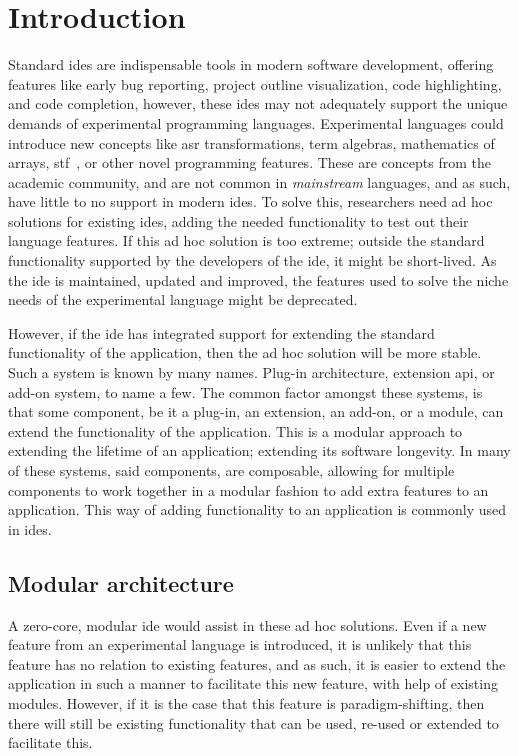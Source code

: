 \chapter{Introduction}

Standard \gls*{ide}s are indispensable tools in modern software development,
offering features like early bug reporting, project outline visualization, code
highlighting, and code completion, however, these \gls*{ide}s may not adequately
support the unique demands of experimental programming languages. Experimental
languages could introduce new concepts like \gls*{asr} transformations, term
algebras, mathematics of arrays, \gls*{stf}~\cite{stf:haveraaen:2020}, or other novel
programming features. These are concepts from the academic community, and are
not common in \textit{mainstream} languages, and as such, have little to no
support in modern \gls*{ide}s. To solve this, researchers need ad hoc solutions
for existing \gls*{ide}s, adding the needed functionality to test out their
language features. If this ad hoc solution is too extreme; outside the standard
functionality supported by the developers of the \gls*{ide}, it might be
short-lived. As the \gls*{ide} is maintained, updated and improved, the features
used to solve the niche needs of the experimental language might be deprecated.

However, if the \gls*{ide} has integrated support for extending the standard
functionality of the application, then the ad hoc solution will be more stable.
Such a system is known by many names. Plug-in architecture, extension \gls*{api},
or add-on system, to name a few. The common factor amongst these systems, is
that some component, be it a plug-in, an extension, an add-on, or a module, can
extend the functionality of the application. This is a modular approach to
extending the lifetime of an application; extending its software longevity. In
many of these systems, said components, are composable, allowing for multiple
components to work together in a modular fashion to add extra features to an
application. This way of adding functionality to an application is commonly used
in \gls*{ide}s.


\section{Modular architecture}

A zero-core, modular \gls*{ide} would assist in these ad hoc solutions. Even if
a new feature from an experimental language is introduced, it is unlikely that
this feature has no relation to existing features, and as such, it is easier to
extend the application in such a manner to facilitate this new feature, with help of
existing modules. However, if it is the case that this feature is
paradigm-shifting, then there will still be existing functionality that can be
used, re-used or extended to facilitate this.

